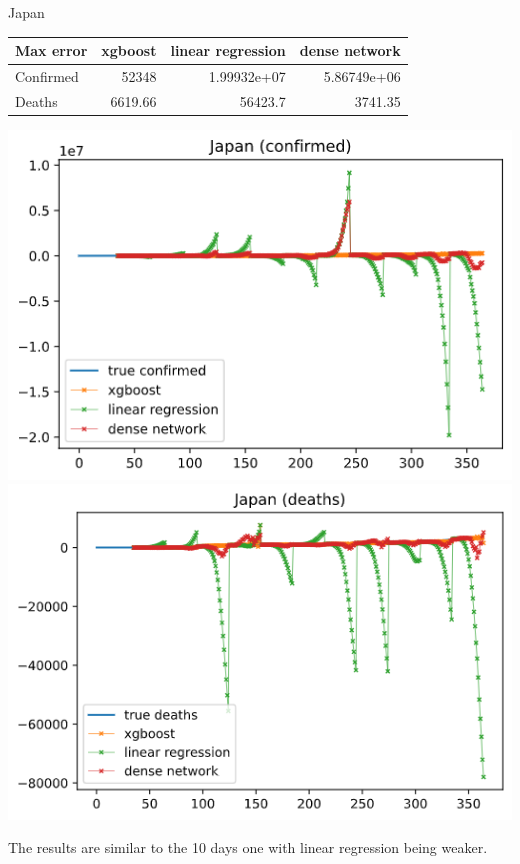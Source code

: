 \documentclass[a4paper,12pt]{article}
\begin{document}
\begin{tcolorbox}
    Japan

    \begin{tabular}{lrrr}
    \toprule
    Max error   &   xgboost &   linear regression &   dense network \\
    \midrule
    Confirmed   &  52348    &         1.99932e+07 &     5.86749e+06 \\
    Deaths      &   6619.66 &     56423.7         &  3741.35        \\
    \bottomrule
    \end{tabular}
    \begin{center}
        \includegraphics[width=\textwidth]{Japan_3-1.png}
        \includegraphics[width=\textwidth]{Japan_3-2.png}
    \end{center}
\end{tcolorbox}
The results are similar to the 10 days one with linear regression being weaker.
\end{document}
